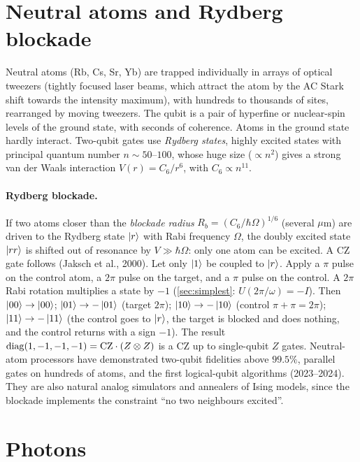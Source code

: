 \section{Neutral atoms and Rydberg blockade}
Neutral atoms (Rb, Cs, Sr, Yb) are trapped individually in arrays of optical tweezers (tightly focused laser beams, which attract the atom by the AC Stark shift towards the intensity maximum), with hundreds to thousands of sites, rearranged by
moving tweezers. The qubit is a pair of hyperfine or nuclear-spin levels of the ground state, with seconds of coherence. Atoms in the ground state hardly interact. Two-qubit gates use \emph{Rydberg states}, highly excited states with principal quantum
number $n\sim50$--$100$, whose huge size ($\propto n^2$) gives a strong van der Waals interaction $V(r)=C_6/r^6$, with $C_6\propto n^{11}$.

\paragraph{Rydberg blockade.} If two atoms closer than the \emph{blockade radius} $R_b=(C_6/\hbar\Omega)^{1/6}$ (several $\mu$m) are driven to the Rydberg state $\left|r\right\rangle$ with Rabi frequency $\Omega$, the doubly excited state $\left|rr\right\rangle$ is shifted out of resonance by
$V\gg\hbar\Omega$: only one atom can be excited. A CZ gate follows (Jaksch et al., 2000). Let only $\left|1\right\rangle$ be coupled to $\left|r\right\rangle$. Apply a $\pi$ pulse on the control atom, a $2\pi$ pulse on the target, and a $\pi$ pulse on the control. A $2\pi$ Rabi
rotation multiplies a state by $-1$ (\cref{sec:simplest}: $U(2\pi/\omega)=-I$). Then $\left|00\right\rangle\to\left|00\right\rangle$; $\left|01\right\rangle\to-\left|01\right\rangle$ (target $2\pi$); $\left|10\right\rangle\to-\left|10\right\rangle$ (control $\pi+\pi=2\pi$); $\left|11\right\rangle\to-\left|11\right\rangle$ (the control goes to $\left|r\right\rangle$, the
target is blocked and does nothing, and the control returns with a sign $-1$). The result $\operatorname{diag}(1,-1,-1,-1)=\mathrm{CZ}\cdot(Z\otimes Z)$ is a CZ up to single-qubit $Z$ gates. Neutral-atom processors have demonstrated two-qubit fidelities above
$99.5\%$, parallel gates on hundreds of atoms, and the first logical-qubit algorithms (2023--2024). They are also natural analog simulators and annealers of Ising models, since the blockade implements the constraint ``no two neighbours excited''.

\section{Photons}
